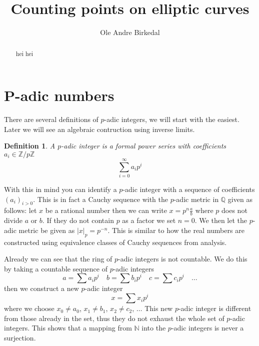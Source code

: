 \documentclass[a4paper,10pt]{amsart}
\title{Counting points on elliptic curves}
\author{Ole Andre Birkedal}
\begin{document}
\newtheorem{thm}{Theorem}
\newtheorem{mydef}{Definition}
\newtheorem{ex}{Example}
\newtheorem{prop}{Proposition}
\newtheorem{lemma}{Lemma}

\begin{abstract}
hei hei
\end{abstract}

\maketitle
\tableofcontents

%
%
%
%
%
%
%

\section{P-adic numbers}
There are several definitions of $p$-adic integers, we will start with the easiest. Later we
will see an algebraic contruction using inverse limits.
\begin{mydef}
 A $p$-adic integer is a formal power series with coefficients $a_i \in \mathbb{Z}/p\mathbb{Z}$
$$ \sum_{i=0}^{\infty} a_i p^i $$
\end{mydef}
With this in mind you can identify a $p$-adic integer with a sequence of coefficients
$(a_i)_{i > 0}$. This is in fact a Cauchy sequence with the $p$-adic metric in $\mathbb{Q}$ given as follows:
let $x$ be a rational number then we can write $x = p^n \frac{a}{b}$ where $p$ does not divide $a$ or $b$.
If they do not contain $p$ as a factor we set $n=0$. We then let the $p$-adic metric be given as
$|x|_p = p^{-n}$. This is similar to how the real numbers are constructed using equivalence classes
of Cauchy sequences from analysis.

Already we can see that the ring of $p$-adic integers is not countable. We do this by taking
a countable sequence of $p$-adic integers
$$a = \sum a_i p^i \quad b = \sum b_i p^i \quad c = \sum c_i p^i \quad \ldots $$
then we construct a new $p$-adic integer
$$x = \sum x_i p^i $$
where we choose $x_0 \neq a_0$, $x_1 \neq b_1$, $x_2 \neq c_2$, $\ldots$
This new $p$-adic integer is different from those already in the set, thus they do not
exhaust the whole set of $p$-adic integers. This shows that a mapping from $\mathbb{N}$ into
the $p$-adic integers is never a surjection.
\end{document}
